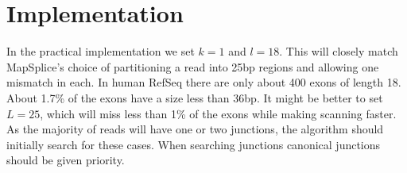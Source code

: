 \documentclass{article}
\begin{document}
\section {Implementation}

In the practical implementation we set $k=1$ and $l=18$. This will closely match MapSplice's choice of partitioning a read into 25bp regions and allowing one mismatch in each. In human RefSeq there are only about 400 exons of length 18. About 1.7\% of the exons have a size less than 36bp. It might be better to set $L=25$, which will miss less than 1\% of the exons while making scanning faster. As the majority of reads will have one or two junctions, the algorithm should initially search for these cases. When searching junctions canonical junctions should be given priority. 
\end{document}

